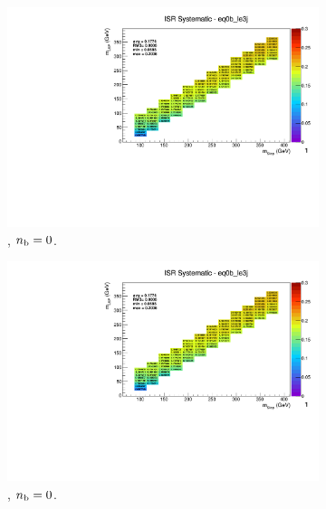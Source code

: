 \begin{figure}[ht!]
  \centering
  \begin{subfigure}[b]{0.32\textwidth}
    \includegraphics[width=\textwidth, page=12]{Figs/sms/t2degen/v19_2/systs/T2_4body_ISR_eq0b_le3j.pdf}
    \caption{\njlow, $n_{\text{b}} = 0$.}
  \end{subfigure}
  \begin{subfigure}[b]{0.32\textwidth}
    \includegraphics[width=\textwidth, page=8]{Figs/sms/t2degen/v19_2/systs/T2_4body_ISR_eq0b_le3j.pdf}
    \caption{\njlow, $n_{\text{b}} = 0$.}
  \end{subfigure}
  \begin{subfigure}[b]{0.32\textwidth}

\end{subfigure}
\end{figure}
